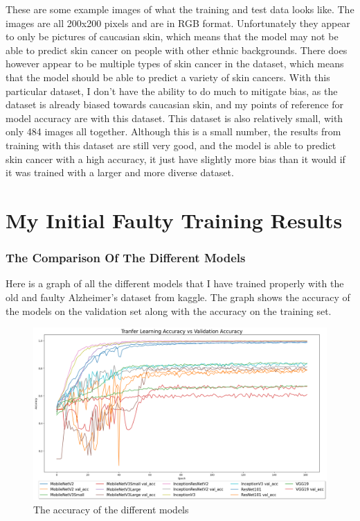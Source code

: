 \documentclass[]{final_report}
\begin{document}
These are some example images of what the training and test data looks like. The images are all 200x200 pixels and are in RGB format.
Unfortunately they appear to only be pictures of caucasian skin, which means that the model may not be able to predict skin cancer on people with other ethnic backgrounds.
There does however appear to be multiple types of skin cancer in the dataset, which means that the model should be able to predict a variety of skin cancers.
With this particular dataset, I don't have the ability to do much to mitigate bias, as the dataset is already biased towards caucasian skin, and my points of reference for model accuracy are with this dataset.
This dataset is also relatively small, with only 484 images all together. Although this is a small number, the results from training with this dataset are still very good, and the model is able to predict skin cancer with a high accuracy, it just have slightly more bias than it would if it was trained with a larger and more diverse dataset.

\chapter{My Initial Faulty Training Results}
\subsection{The Comparison Of The Different Models}
Here is a graph of all the different models that I have trained properly with the old and faulty Alzheimer's dataset from kaggle.
The graph shows the accuracy of the models on the validation set along with the accuracy on the training set.
\begin{figure}[h]
  \centering
  \includegraphics[width=1\textwidth]{images/good-training-acc-vs-val.png}
  \caption{The accuracy of the different models}
  \label{fig:loss}
\end{figure}
\pagebreak
\end{document}
